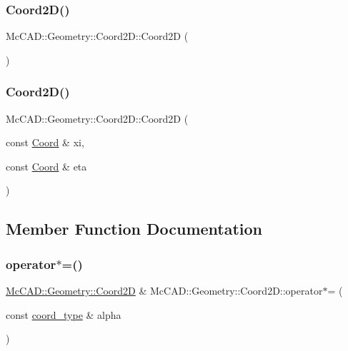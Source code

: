 \subsubsection{\texorpdfstring{Coord2\+D()}{Coord2D()}\hspace{0.1cm}{\footnotesize\ttfamily [3/4]}}
{\footnotesize\ttfamily Mc\+C\+A\+D\+::\+Geometry\+::\+Coord2\+D\+::\+Coord2D (\begin{DoxyParamCaption}{ }\end{DoxyParamCaption})}

\mbox{\label{classMcCAD_1_1Geometry_1_1Coord2D_a2c78a0bbf010eac6b30cb780dac175a3}} 
\subsubsection{\texorpdfstring{Coord2\+D()}{Coord2D()}\hspace{0.1cm}{\footnotesize\ttfamily [4/4]}}
{\footnotesize\ttfamily Mc\+C\+A\+D\+::\+Geometry\+::\+Coord2\+D\+::\+Coord2D (\begin{DoxyParamCaption}\item[{const \hyperlink{classMcCAD_1_1Geometry_1_1Coord}{Coord} \&}]{xi,  }\item[{const \hyperlink{classMcCAD_1_1Geometry_1_1Coord}{Coord} \&}]{eta }\end{DoxyParamCaption})}



\subsection{Member Function Documentation}
\mbox{\label{classMcCAD_1_1Geometry_1_1Coord2D_af6db29435bbb9735a2be654a4d67d6ec}} 
\subsubsection{\texorpdfstring{operator$\ast$=()}{operator*=()}\hspace{0.1cm}{\footnotesize\ttfamily [1/2]}}
{\footnotesize\ttfamily \hyperlink{classMcCAD_1_1Geometry_1_1Coord2D}{Mc\+C\+A\+D\+::\+Geometry\+::\+Coord2D} \& Mc\+C\+A\+D\+::\+Geometry\+::\+Coord2\+D\+::operator$\ast$= (\begin{DoxyParamCaption}\item[{const \hyperlink{namespaceMcCAD_1_1Geometry_ac043b37a4a7e849fca22869e1982d2f8}{coord\+\_\+type} \&}]{alpha }\end{DoxyParamCaption})}



